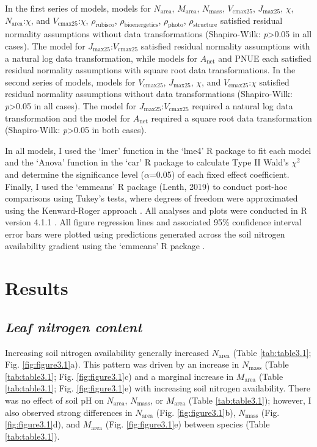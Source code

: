In the first series of models, models for $N_\mathrm{area}$, $M_\mathrm{area}$, $N_\mathrm{mass}$, $V_\mathrm{cmax25}$, $J_\mathrm{max25}$, $\chi$, $N_{\mathrm{area}}$:$\chi$, and $V_\mathrm{cmax25}$:$\chi$, $\rho_\mathrm{rubisco}$, $\rho_\mathrm{bioenergetics}$, $\rho_\mathrm{photo}$, $\rho_\mathrm{structure}$ satisfied residual normality assumptions without data transformations (Shapiro-Wilk: \textit{p}>0.05 in all cases). The model for $J_\mathrm{max25}$:$V_\mathrm{cmax25}$ satisfied residual normality assumptions with a natural log data transformation, while models for $A_\mathrm{net}$ and PNUE each satisfied residual normality assumptions with square root data transformations. In the second series of models, models for $V_\mathrm{cmax25}$, $J_\mathrm{max25}$, $\chi$, and $V_\mathrm{cmax25}$:$\chi$ satisfied residual normality assumptions without data transformations (Shapiro-Wilk: \textit{p}>0.05 in all cases). The model for $J_\mathrm{max25}$:$V_\mathrm{cmax25}$ required a natural log data transformation and the model for $A_\mathrm{net}$ required a square root data transformation (Shapiro-Wilk: \textit{p}>0.05 in both cases).
    
In all models, I used the ‘lmer’ function in the ‘lme4’ R package  to fit each model and the ‘Anova’ function in the ‘car’ R package  to calculate Type II Wald’s $\chi^2$ and determine the significance level ($\alpha$=0.05) of each fixed effect coefficient. Finally, I used the ‘emmeans’ R package (Lenth, 2019) to conduct post-hoc comparisons using Tukey’s tests, where degrees of freedom were approximated using the Kenward-Roger approach . All analyses and plots were conducted in R version 4.1.1 . All figure regression lines and associated 95\% confidence interval error bars were plotted using predictions generated across the soil nitrogen availability gradient using the ‘emmeans’ R package .
    
\section{Results}
\subsection{\textit{Leaf nitrogen content}}  
\noindent Increasing soil nitrogen availability generally increased $N_\mathrm{area}$ (Table \ref{tab:table3.1}; Fig. \ref{fig:figure3.1}a). This pattern was driven by an increase in $N_\mathrm{mass}$ (Table \ref{tab:table3.1}; Fig. \ref{fig:figure3.1}c) and a marginal increase in $M_\mathrm{area}$ (Table \ref{tab:table3.1}; Fig. \ref{fig:figure3.1}e) with increasing soil nitrogen availability. There was no effect of soil pH on $N_\mathrm{area}$, $N_\mathrm{mass}$, or $M_\mathrm{area}$ (Table \ref{tab:table3.1}); however, I also observed strong differences in $N_\mathrm{area}$ (Fig. \ref{fig:figure3.1}b), $N_\mathrm{mass}$ (Fig. \ref{fig:figure3.1}d), and $M_\mathrm{area}$ (Fig. \ref{fig:figure3.1}e) between species (Table \ref{tab:table3.1}).
    \clearpage

